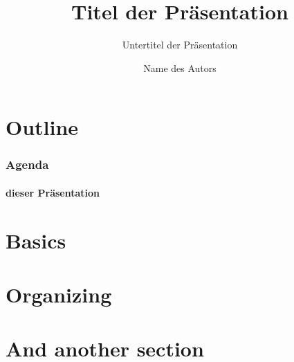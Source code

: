 \documentclass[t]{beamer}
\author{Name des Autors}
\title{Titel der Pr\"asentation}
\subtitle{Untertitel der Pr\"asentation}
\begin{document}
    

    \section*{Outline}
    \begin{frame}
        \frametitle{Agenda}
        \framesubtitle{dieser Pr\"asentation}
        \tableofcontents
    \end{frame}

    \section{Basics}

    

    

    \section{Organizing}

    

    \section{And another section}

    

    

    
\end{document}
